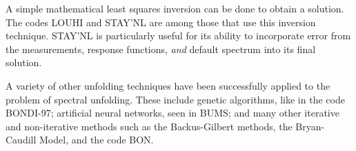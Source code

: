 A simple mathematical least squares inversion can be done to obtain a solution.
The codes LOUHI and STAY'NL are among those that use this inversion technique.
STAY'NL is particularly useful for its ability to incorporate error from the measurements, response functions, {\it and} default spectrum into its final solution.

A variety of other unfolding techniques have been successfully applied to the problem of spectral unfolding.
These include genetic algorithms, like in the code BONDI-97; artificial neural networks, seen in BUMS; and many other iterative and non-iterative methods such as the Backus-Gilbert methods, the Bryan-Caudill Model, and the code BON.

